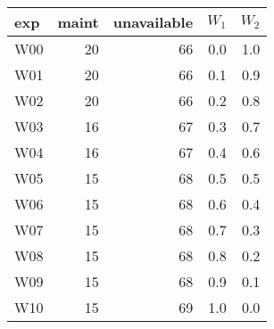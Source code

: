 \begin{tabular}{lrrrr}
\toprule
 exp &  maint &  unavailable &  $W_1$ &  $W_2$ \\
\midrule
 W00 &     20 &           66 &    0.0 &    1.0 \\
 W01 &     20 &           66 &    0.1 &    0.9 \\
 W02 &     20 &           66 &    0.2 &    0.8 \\
 W03 &     16 &           67 &    0.3 &    0.7 \\
 W04 &     16 &           67 &    0.4 &    0.6 \\
 W05 &     15 &           68 &    0.5 &    0.5 \\
 W06 &     15 &           68 &    0.6 &    0.4 \\
 W07 &     15 &           68 &    0.7 &    0.3 \\
 W08 &     15 &           68 &    0.8 &    0.2 \\
 W09 &     15 &           68 &    0.9 &    0.1 \\
 W10 &     15 &           69 &    1.0 &    0.0 \\
\bottomrule
\end{tabular}

